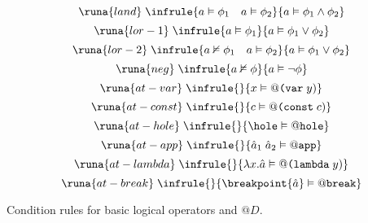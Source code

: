 \begin{table}[H]
    \centering
    \begin{multicols}{2}
    \begin{equation*}
        \runa{land}\; \infrule{a \vDash \phi_1 \quad a \vDash \phi_2}{a \vDash \phi_1 \land \phi_2}
    \end{equation*}\break
    \begin{equation*}
        \runa{lor-1}\; \infrule{a \vDash \phi_1}{a \vDash \phi_1 \lor \phi_2}
    \end{equation*}\break
    \begin{equation*}
        \runa{lor-2}\; \infrule{a \nvDash \phi_1 \quad a \vDash \phi_2}{a \vDash \phi_1 \lor \phi_2}
    \end{equation*}\break
    \begin{equation*}
        \runa{neg}\; \infrule{a \nvDash \phi}{a \vDash \neg \phi}
    \end{equation*}\break
    \begin{equation*}
        \runa{at-var}\; \infrule{}{x \vDash @ \texttt{(var}\; y)} 
    \end{equation*}\break
    \begin{equation*}
        \runa{at-const}\; \infrule{}{c \vDash @ \texttt{(const}\; c)} 
    \end{equation*}\break
    \begin{equation*}
        \runa{at-hole}\; \infrule{}{\hole \vDash @ \texttt{hole}} 
    \end{equation*}\break
    \begin{equation*}
        \runa{at-app}\; \infrule{}{\hat{a}_1\; \hat{a}_2 \vDash @ \texttt{app}} 
    \end{equation*}\break
    \begin{equation*}
        \runa{at-lambda}\; \infrule{}{\lambda x.\hat{a} \vDash @ \texttt{(lambda}\; y)} 
    \end{equation*}\break
    \begin{equation*}
        \runa{at-break}\; \infrule{}{\breakpoint{\hat{a}} \vDash @ \texttt{break}} 
    \end{equation*}\break
    \end{multicols}
    \caption{Condition rules for basic logical operators and $@ D$.}
    \label{tab:EEsemcond1}
\end{table}
%
